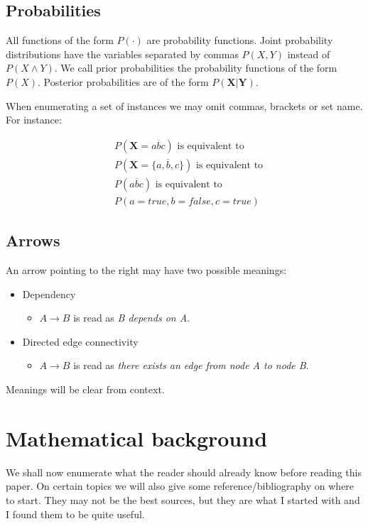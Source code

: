 \documentclass[a4paper,10pt]{article}
\theoremstyle{plain}
\begin{document}
\begin{appendices}
\subsection{Probabilities}

All functions of the form $P(\cdot)$ are probability functions. Joint probability distributions
have the variables separated by commas $P(X,Y)$ instead of $P(X \wedge Y)$. We call prior
probabilities the probability functions of the form $P(X)$. Posterior probabilities are of the form
$P(\mathbf{X}|\mathbf{Y})$.

When enumerating a set of instances we may omit commas, brackets or set name. For instance:

\begin{align*}
  &P(\mathbf{X}=a\overline{b}c) \text{~is equivalent to} \\
  &P(\mathbf{X}=\{a, \overline{b}, c\}) \text{~is equivalent to} \\
  &P(a\overline{b}c) \text{~is equivalent to} \\
  &P(a=true,b=false,c=true)
\end{align*}

\subsection{Arrows}

An arrow pointing to the right may have two possible meanings:

\begin{itemize}
  \item Dependency
    \begin{itemize}
      \item $A \to B$ is read as \textit{B depends on A}.
    \end{itemize}
  \item Directed edge connectivity
    \begin{itemize}
      \item $A \to B$ is read as \textit{there exists an edge from node A to node B}.
    \end{itemize}
\end{itemize}

Meanings will be clear from context.

\section{Mathematical background}\label{app:bak}

We shall now enumerate what the reader should already know before reading this paper. On certain
topics we will also give some reference/bibliography on where to start. They may not be the best
sources, but they are what I started with and I found them to be quite useful.


\end{appendices}
\end{document}
